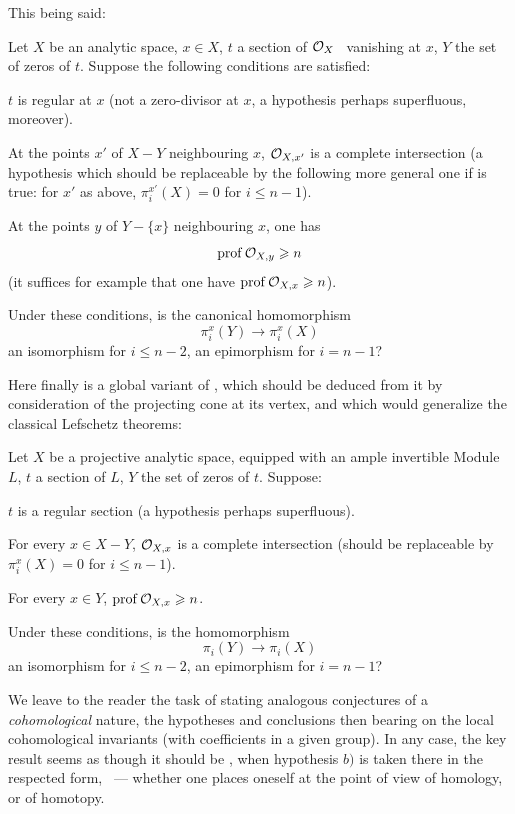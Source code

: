 This being said:

\begin{problem} \label{XIII.4.2}
Let $X$ be an analytic space, $x\in X$, $t$ a section of $\mathcal{O}_X$ \ vanishing at $x$, $Y$ the set of zeros of $t$. Suppose the following conditions are satisfied:
\begin{enumeratea}
\item
$t$ is regular at $x$ (\ie not a zero-divisor at $x$, a hypothesis perhaps superfluous, moreover).
\item
At the points $x'$ of $X-Y$ neighbouring $x$, ${\mathcal O}_{X, x'}$ is a complete intersection (a hypothesis which should be replaceable by the following more general one if  is true: for $x'$ as above, $\pi_i^{x'}(X)=0$ for $i\le n-1$).
\item
At the points $y$ of $Y-\{ x\}$ neighbouring $x$, one has
$$
\operatorname{prof} {\mathcal O}_{X, y}\geqslant n$$
(it suffices for example that one have $\operatorname{prof}{\mathcal O}_{X, x}\geqslant n$).
\end{enumeratea}

Under these conditions, is the canonical homomorphism
$$
\pi_i^x(Y)\to \pi_i^x(X)$$
an isomorphism for $i\le n-2$, an epimorphism for $i=n-1$?
\end{problem}

Here finally is a global variant of , which should be deduced from it by consideration of the projecting cone at its vertex, and which would generalize the classical Lefschetz theorems:

\begin{problem} \label{XIII.4.3}
Let $X$ be a projective analytic space, equipped with an ample invertible Module~$L$, $t$ a section of $L$, $Y$ the set of zeros of $t$. Suppose:
\begin{enumeratea}
\item
$t$ is a regular section (a hypothesis perhaps superfluous).
\item
For every $x\in X-Y$, ${\mathcal O}_{X, x}$ is a complete intersection (should be replaceable by $\pi_i^{x}(X)=0$ for $i\le n-1$).
\item
For every $x\in Y$, $\operatorname{prof} {\mathcal O}_{X, x}\geqslant n$.
\end{enumeratea}

Under these conditions, is the homomorphism
$$
\pi_i(Y)\to \pi_i(X)$$
an isomorphism for $i\le n-2$, an epimorphism for $i=n-1$?
\end{problem}

We leave to the reader the task of stating analogous conjectures of a \emph{cohomological} nature, the hypotheses and conclusions then bearing on the local cohomological invariants (with coefficients in a given group). In any case, the key result seems as though it should be , when hypothesis $b)$ is taken there in the respected form, \ --- whether one places oneself at the point of view of homology, or of homotopy.

